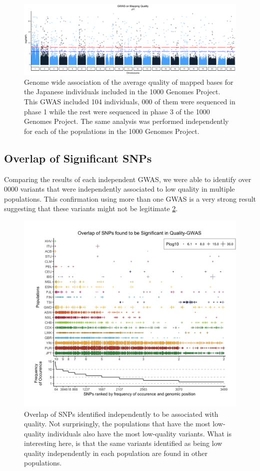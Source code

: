 \documentclass[12pt]{amsart}
\begin{document}
\begin{figure}
\includegraphics[width=\hsize,keepaspectratio]{GWAS_Qual_GenomeWide_JPT.jpg}
\caption{Genome wide association of the average quality of mapped bases for the Japanese individuals included in the 1000 Genomes Project. This GWAS included 104 individuals, 000 of them were sequenced in phase 1 while the rest were sequenced in phase 3 of the 1000 Genomes Project. The same analysis was performed independently for each of the populations in the 1000 Genomes Project. }
 \label{Figure2}
\end{figure}

\subsection{Overlap of Significant SNPs}
Comparing the results of each independent GWAS, we were able to identify over 0000 variants that were independently associated to low quality in multiple populations. This confirmation using more than one GWAS is a very strong result suggesting that these variants might not be legitimate  \ref{Figure3}. 

\begin{figure}
\includegraphics[width=\hsize,keepaspectratio]{SNPOverlap6.jpg}

\caption{Overlap of SNPs identified independently to be associated with quality. Not surprisingly, the populations that have the most low-quality individuals also have the most low-quality variants. What is interesting here, is that the same variants identified as being low quality independently in each population are found in other populations. }
  \label{Figure3}
\end{figure}
\end{document}
